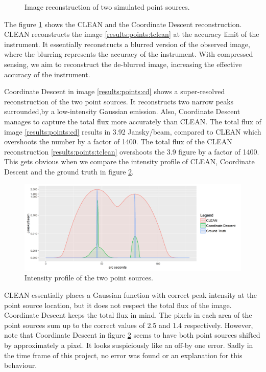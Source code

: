 \begin{figure}[h]
	\caption{Image reconstruction of two simulated point sources.}
	\label{results:points}
\end{figure}

The figure \ref{results:points} shows the CLEAN and the Coordinate Descent reconstruction. CLEAN reconstructs the image \ref{results:points:tclean} at the accuracy limit of the instrument. It essentially reconstructs a blurred version of the observed image, where the blurring represents the accuracy of the instrument. With compressed sensing, we aim to reconstruct the de-blurred image, increasing the effective accuracy of the instrument. 

Coordinate Descent in image \ref{results:points:cd} shows a super-resolved reconstruction of the two point sources. It reconstructs two narrow peaks surrounded,by a low-intensity Gaussian emission. Also, Coordinate Descent manages to capture the total flux more accurately than CLEAN.  The total flux of image \ref{results:points:cd} results in 3.92 Jansky/beam, compared to CLEAN which overshoots the number by a factor of 1400. The total flux of the CLEAN reconstruction \ref{results:points:tclean} overshoots the 3.9 figure by a factor of 1400. This gets obvious when we compare the intensity profile of CLEAN, Coordinate Descent and the ground truth in figure \ref{results:points:contour}.

\begin{figure}[h]
	\centering
	\includegraphics[width=0.8\linewidth]{./chapters/20.results/points/contour_points.png}
	\caption{Intensity profile of the two point sources.}
	\label{results:points:contour}
\end{figure}

CLEAN essentially places a Gaussian function with correct peak intensity at the point source location, but it does not respect the total flux of the image. Coordinate Descent keeps the total flux in mind. The pixels in each area of the point sources sum up to the correct values of 2.5 and 1.4 respectively. However, note that Coordinate Descent in figure \ref{results:points:contour} seems to have both point sources shifted by approximately a pixel. It looks suspiciously like an off-by one error. Sadly in the time frame of this project, no error was found or an explanation for this behaviour.

